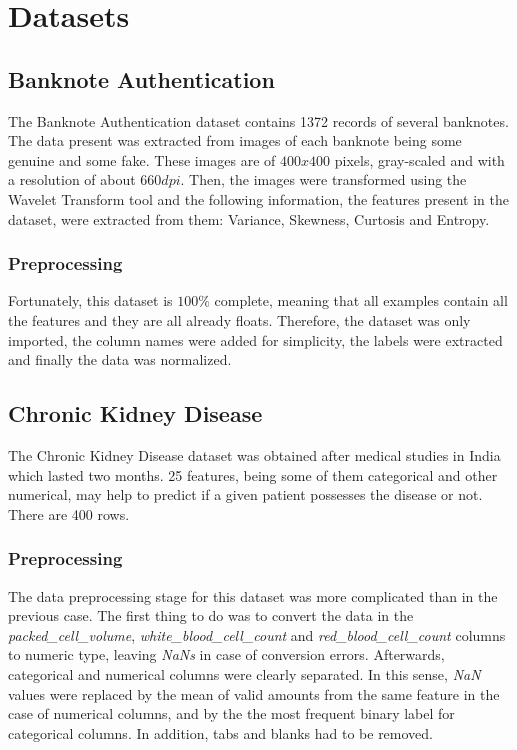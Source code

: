 \documentclass[11pt,a4paper]{article}
\begin{document}
\section{Datasets}

\subsection{Banknote Authentication}

The Banknote Authentication dataset \cite{ba} contains 1372 records of several banknotes. The data present was extracted from images of each banknote being some genuine and some fake. These images are of $400x400$ pixels, gray-scaled and with a resolution of about $660 dpi$. Then, the images were transformed using the Wavelet Transform tool and the following information, the features present in the dataset, were extracted from them: Variance, Skewness, Curtosis and Entropy.

\subsubsection{Preprocessing}
Fortunately, this dataset is $100\%$ complete, meaning that all examples contain all the features and they are all already floats. Therefore, the dataset was only imported, the column names were added for simplicity, the labels were extracted and finally the data was normalized. 

\subsection{Chronic Kidney Disease}

The Chronic Kidney Disease dataset \cite{ckd} was obtained after medical studies in India which lasted two months. 25 features, being some of them categorical and other numerical, may help to predict if a given patient possesses the disease or not. There are 400 rows.

\subsubsection{Preprocessing}

The data preprocessing stage for this dataset was more complicated than in the previous case. The first thing to do was to convert the data in the \textit{packed\_cell\_volume}, \textit{white\_blood\_cell\_count} and \textit{red\_blood\_cell\_count} columns to numeric type, leaving \textit{NaNs} in case of conversion errors. Afterwards, categorical and numerical columns were clearly separated. In this sense, \textit{NaN} values were replaced by the mean of valid amounts from the same feature in the case of numerical columns, and by the the most frequent binary label for categorical columns. In addition, tabs and blanks had to be removed.
\end{document}
